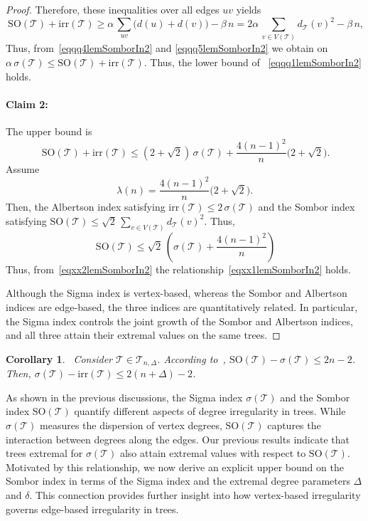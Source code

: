 \documentclass[12pt, a4paper]{article}
\newcommand{\claim}[1]{\paragraph*{Claim #1:}}
\newtheorem{corollary}[theorem]{Corollary}
\newcommand{\TT}{\mathcal{T}}
\newcommand{\irr}{\mathrm{irr}}
\newcommand{\SO}{\mathrm{SO}}
\begin{document}
\begin{proof}
Therefore, these inequalities over all edges $uv$ yields
\begin{equation}~\label{eqqq5lemSomborIn2}
\mathrm{SO}(\mathcal{T})+\irr(\mathcal{T})\geqslant \alpha\,\sum_{uv}\bigl(d(u)+d(v)\bigr)-\beta\,n=2\alpha\,\sum_{v\in V(\TT)} d_\TT(v)^2-\beta\,n,
\end{equation}
Thus, from~\eqref{eqqq4lemSomborIn2} and \eqref{eqqq5lemSomborIn2} we obtain on $\alpha\,\sigma(\TT)\leqslant \mathrm{SO}(\TT)+\irr(\TT)$. Thus, the lower bound of ~\eqref{eqqq1lemSomborIn2} holds.

\claim{2} The upper bound is
\begin{equation}~\label{eqxx1lemSomborIn2}
\mathrm{SO}(\TT)+\irr(\TT) \leqslant (2+\sqrt{2})\,\sigma(\TT)+\frac{4(n-1)^2}{n}\bigl(2+\sqrt{2}\bigr).
\end{equation}
Assume 
$$
\lambda(n)=\frac{4(n-1)^2}{n}\bigl(2+\sqrt{2}\bigr).
$$
Then, the Albertson index satisfying $\irr(\TT)\leqslant 2\, \sigma(\TT)$ and the Sombor index satisfying $\mathrm{SO}(\TT)\leqslant\sqrt{2}\,\sum_{v\in V(\TT)}d_\TT(v)^2$. Thus, 
\begin{equation}~\label{eqxx2lemSomborIn2}
\mathrm{SO}(\TT)\leqslant\sqrt{2}\,\left(\sigma(\TT)+\frac{4(n-1)^2}{n}\right)
\end{equation}
Thus, from~\eqref{eqxx2lemSomborIn2} the relationship~\eqref{eqxx1lemSomborIn2} holds. 

Although the Sigma index is vertex-based, whereas the Sombor and Albertson indices are edge-based, the three indices are quantitatively related. In particular, the Sigma index controls the joint growth of the Sombor and Albertson indices, and all three attain their extremal values on the same trees.

\end{proof}

\begin{corollary}~\label{coroSigman2llary}
Consider $\TT\in \mathcal{T}_{n,\Delta}$. According to~\cite{Hamoud25Belov}, $\SO(\TT)-\sigma(\TT)\leqslant 2n-2$. Then, $\sigma(\TT)-\irr(\TT)\leqslant 2(n+\Delta)-2$.
\end{corollary}

As shown in the previous discussions, the Sigma index $\sigma(\TT)$ and the Sombor index $\SO(\TT)$ quantify different aspects of degree irregularity in trees. While $\sigma(\TT)$ measures the dispersion of vertex degrees, $\SO(\TT)$ captures the interaction between degrees along the edges. Our previous results indicate that trees extremal for $\sigma(\TT)$ also attain extremal values with respect to $\SO(\TT)$. Motivated by this relationship, we now derive an explicit upper bound on the Sombor index in terms of the Sigma index and the extremal degree parameters $\Delta$ and $\delta$. This connection provides further insight into how vertex-based irregularity governs edge-based irregularity in trees.
\end{document}
